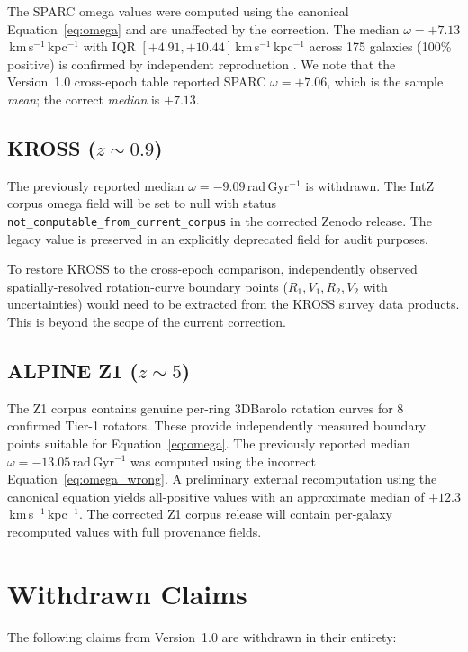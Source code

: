 \documentclass[a4paper,12pt]{article}
\newcommand{\om}{\omega}
\newcommand{\omunit}{km\,s$^{-1}$\,kpc$^{-1}$}
\begin{document}
The SPARC omega values were computed using the canonical
Equation~\ref{eq:omega} and are unaffected by the correction.
The median $\om = +7.13$\,\omunit{} with IQR
$[+4.91, +10.44]$\,\omunit{} across 175 galaxies (100\% positive)
is confirmed by independent reproduction \citep{flynn2026baryonic}.
We note that the Version~1.0 cross-epoch table reported SPARC
$\om = +7.06$, which is the sample \emph{mean}; the correct
\emph{median} is $+7.13$.

\subsection{KROSS ($z\sim0.9$)}

The previously reported median $\om = -9.09$\,rad\,Gyr$^{-1}$
is withdrawn. The IntZ corpus omega field will be set to null with
status \texttt{not\_computable\_from\_current\_corpus} in the
corrected Zenodo release. The legacy value is preserved in an
explicitly deprecated field for audit purposes.

To restore KROSS to the cross-epoch comparison, independently
observed spatially-resolved rotation-curve boundary points
($R_1, V_1, R_2, V_2$ with uncertainties) would need to be
extracted from the KROSS survey data products. This is beyond the
scope of the current correction.

\subsection{ALPINE Z1 ($z\sim5$)}

The Z1 corpus contains genuine per-ring 3DBarolo rotation curves for
8 confirmed Tier-1 rotators. These provide independently measured
boundary points suitable for Equation~\ref{eq:omega}. The previously
reported median $\om = -13.05$\,rad\,Gyr$^{-1}$ was computed using
the incorrect Equation~\ref{eq:omega_wrong}. A preliminary external
recomputation using the canonical equation yields all-positive values
with an approximate median of $+12.3$\,\omunit. The corrected Z1
corpus release will contain per-galaxy recomputed values with full
provenance fields.

\section{Withdrawn Claims}
\label{sec:withdrawn}

The following claims from Version~1.0 are withdrawn in their entirety:
\end{document}
